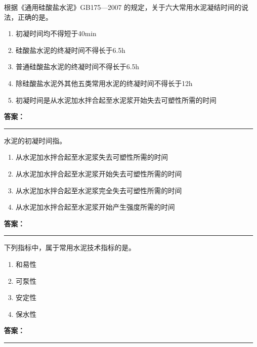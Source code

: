 \documentclass[UTF8,fontset=fandol,11pt]{ctexart}
\newcommand{\answerline}{\textcolor{answerred}{\rule{2.4cm}{0.7pt}}}
\begin{document}
\begin{quizbox}[title={第 32 题}]
根据《通用硅酸盐水泥》GB175—2007 的规定，关于六大常用水泥凝结时间的说法，正确的是。\\
\begin{enumerate}[label=\Alph*.]
\item 初凝时间均不得短于40min
\item 硅酸盐水泥的终凝时间不得长于6.5h
\item 普通硅酸盐水泥的终凝时间不得长于6.5h
\item 除硅酸盐水泥外其他五类常用水泥的终凝时间不得长于12h
\item 初凝时间是从水泥加水拌合起至水泥浆开始失去可塑性所需的时间
\end{enumerate}
\textbf{\textcolor{answerred}{答案：}} \answerline
\end{quizbox}

\vspace{0.2em}

\begin{quizbox}[title={第 33 题}]
水泥的初凝时间指。\\
\begin{enumerate}[label=\Alph*.]
\item 从水泥加水拌合起至水泥浆失去可塑性所需的时间
\item 从水泥加水拌合起至水泥浆开始失去可塑性所需的时间
\item 从水泥加水拌合起至水泥浆完全失去可塑性所需的时间
\item 从水泥加水拌合起至水泥浆开始产生强度所需的时间
\end{enumerate}
\textbf{\textcolor{answerred}{答案：}} \answerline
\end{quizbox}

\vspace{0.2em}

\begin{quizbox}[title={第 34 题}]
下列指标中，属于常用水泥技术指标的是。\\
\begin{enumerate}[label=\Alph*.]
\item 和易性
\item 可泵性
\item 安定性
\item 保水性
\end{enumerate}
\textbf{\textcolor{answerred}{答案：}} \answerline
\end{quizbox}

\vspace{0.2em}
\end{document}

